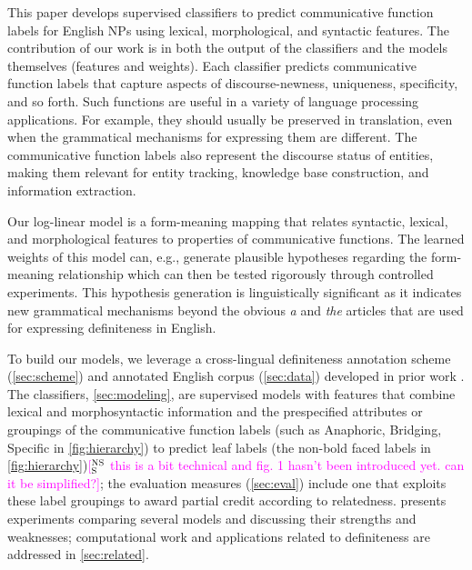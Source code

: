 \documentclass[11pt,letterpaper]{article}
\newcommand{\ensuretext}[1]{#1}
\newcommand{\nssmarker}{\ensuretext{\textcolor{magenta}{\ensuremath{^{\textsc{NS}}_{\textsc{S}}}}}}
\newcommand{\abmarker}{\ensuretext{\textcolor{red}{\ensuremath{^{\textsc{A}}_{\textsc{B}}}}}}
\newcommand{\arkcomment}[3]{\ensuretext{\textcolor{#3}{[#1 #2]}}}
\newcommand{\nss}[1]{\arkcomment{\nssmarker}{#1}{magenta}}
\newcommand{\ab}[1]{\arkcomment{\abmarker}{#1}{red}}
\begin{document}
This paper develops supervised classifiers to predict communicative function labels for English NPs  
using lexical, morphological, and syntactic features.   
The contribution of our work is in both the output of the classifiers and the models themselves (features and weights).  %
Each classifier predicts communicative function labels that capture aspects of discourse-newness, uniqueness, specificity, and so forth. %
Such functions are useful in a variety of language processing applications. For example, they should usually be preserved in translation, even when the grammatical mechanisms 
for expressing them are different. 
The communicative function labels also represent the discourse status of entities, 
making them relevant for entity tracking, knowledge base construction, and information extraction. 

Our log-linear model is a form-meaning mapping that relates syntactic, lexical, and morphological features 
to properties of communicative functions. The learned weights of this model can, e.g., generate plausible hypotheses regarding the form-meaning relationship which can then be tested rigorously through controlled experiments. 
This hypothesis generation is linguistically significant as it indicates new grammatical mechanisms 
beyond the obvious {\em a} and {\em the} articles that are used for expressing definiteness in English. 


To build our models, we leverage a cross-lingual definiteness annotation scheme (\cref{sec:scheme}) 
and annotated English corpus (\cref{sec:data}) developed in prior work \citep{bhatia14}.
The classifiers, \cref{sec:modeling}, are supervised models
with features that combine lexical and morphosyntactic information 
and the prespecified attributes or groupings of the communicative function labels (such as Anaphoric, Bridging, Specific in \cref{fig:hierarchy}) to predict leaf labels (the non-bold faced labels in \cref{fig:hierarchy})\nss{this is a bit technical and fig. 1 hasn't been introduced yet. can it be simplified?};
the evaluation measures (\cref{sec:eval}) include one that exploits these label groupings 
to award partial credit according to relatedness.
 presents experiments comparing several models and discussing their strengths and weaknesses;
computational work and applications related to definiteness are addressed in \cref{sec:related}.
\end{document}
